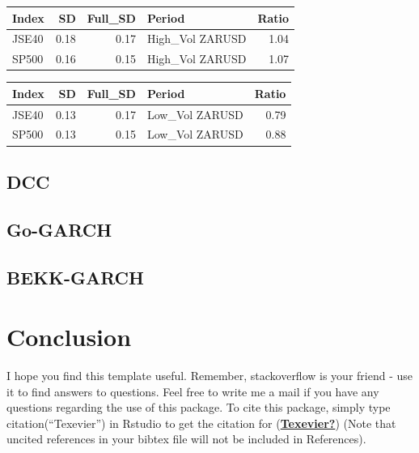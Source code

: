 \documentclass[11pt,preprint, authoryear]{elsarticle}
\let\origtable\table
\let\endorigtable\endtable
\renewenvironment{table}[1][2] {
    \expandafter\origtable\expandafter[H]
} {
    \endorigtable
}
\numberwithin{equation}{section}
\numberwithin{figure}{section}
\numberwithin{table}{section}
\begin{document}
\begin{table}[H]
\centering
\caption{ZAR/USD High Volatility} 
\begin{tabular}{lrrlr}
  \hline
Index & SD & Full\_SD & Period & Ratio \\ 
  \hline
JSE40 & 0.18 & 0.17 & High\_Vol ZARUSD & 1.04 \\ 
  SP500 & 0.16 & 0.15 & High\_Vol ZARUSD & 1.07 \\ 
   \hline
\end{tabular}
\end{table}
\begin{table}[H]
\centering
\caption{ZAR/USD Low Volatility} 
\begin{tabular}{lrrlr}
  \hline
Index & SD & Full\_SD & Period & Ratio \\ 
  \hline
JSE40 & 0.13 & 0.17 & Low\_Vol ZARUSD & 0.79 \\ 
  SP500 & 0.13 & 0.15 & Low\_Vol ZARUSD & 0.88 \\ 
   \hline
\end{tabular}
\end{table}

\hypertarget{dcc}{%
\subsection{DCC}\label{dcc}}

\hypertarget{go-garch-1}{%
\subsection{Go-GARCH}\label{go-garch-1}}

\hypertarget{bekk-garch-1}{%
\subsection{BEKK-GARCH}\label{bekk-garch-1}}

\hypertarget{conclusion}{%
\section{Conclusion}\label{conclusion}}

I hope you find this template useful. Remember, stackoverflow is your
friend - use it to find answers to questions. Feel free to write me a
mail if you have any questions regarding the use of this package. To
cite this package, simply type citation(``Texevier'') in Rstudio to get
the citation for (\protect\hyperlink{ref-Texevier}{\textbf{Texevier?}})
(Note that uncited references in your bibtex file will not be included
in References).
\end{document}
